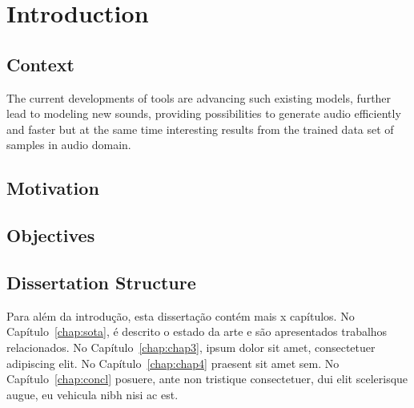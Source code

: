 \chapter{Introduction} \label{chap:intro}

\section{Context} \label{sec:context}
The current developments of tools are advancing such existing models, further lead to modeling new sounds, providing possibilities to generate audio efficiently and faster but at the same time interesting results from the trained data set of samples in audio domain. \cite{tahiroglu_-terity_2020}


\section{Motivation} \label{sec:motivation}

\section{Objectives} \label{sec:objectives}


\section{Dissertation Structure} \label{sec:struct}

Para além da introdução, esta dissertação contém mais x capítulos.
No Capítulo~\ref{chap:sota}, é descrito o estado da arte e são
apresentados trabalhos relacionados. 
No Capítulo~\ref{chap:chap3}, ipsum dolor sit amet, consectetuer
adipiscing elit.
No Capítulo~\ref{chap:chap4} praesent sit amet sem. 
No Capítulo~\ref{chap:concl} posuere, ante non tristique
consectetuer, dui elit scelerisque augue, eu vehicula nibh nisi ac
est. 
